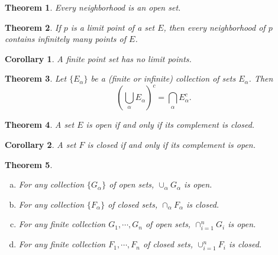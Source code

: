 \documentclass{article}
\newtheorem{theorem}{Theorem}
\numberwithin{theorem}{section}
\newtheorem*{corollary*}{Corollary}
\begin{document}
\setcounter{theorem}{18}
\begin{theorem}
  Every neighborhood is an open set.
\end{theorem}

\begin{theorem}
  If $p$ is a limit point of a set $E$, then every neighborhood of $p$ contains
  infinitely many points of $E$.
\end{theorem}

\begin{corollary*}
  A finite point set has no limit points.
\end{corollary*}

\setcounter{theorem}{21}
\begin{theorem}
  Let $\{E_{\alpha}\}$ be a (finite or infinite) collection of sets
  $E_{\alpha}$. Then \[
    \left(\bigcup_{\alpha} E_{\alpha}\right)^c =
    \bigcap_{\alpha} E_{\alpha}^c.
  \]
\end{theorem}

\begin{theorem}
  A set $E$ is open if and only if its complement is closed.
\end{theorem}

\begin{corollary*}
  A set $F$ is closed if and only if its complement is open.
\end{corollary*}

\setcounter{theorem}{23}
\begin{theorem}
  \begin{enumerate}[(a)]
    \item For any collection $\{G_{\alpha}\}$ of open sets, $\cup_{\alpha}
      G_{\alpha}$ is open.
    \item For any collection $\{F_{\alpha}\}$ of closed sets, $\cap_{\alpha}
      F_{\alpha}$ is closed.
    \item For any finite collection $G_1, \cdots, G_n$ of open sets,
      $\cap_{i=1}^n G_i$ is open.
    \item For any finite collection $F_1, \cdots, F_n$ of closed sets,
      $\cup_{i=1}^n F_i$ is closed.
  \end{enumerate}
\end{theorem}
\end{document}

